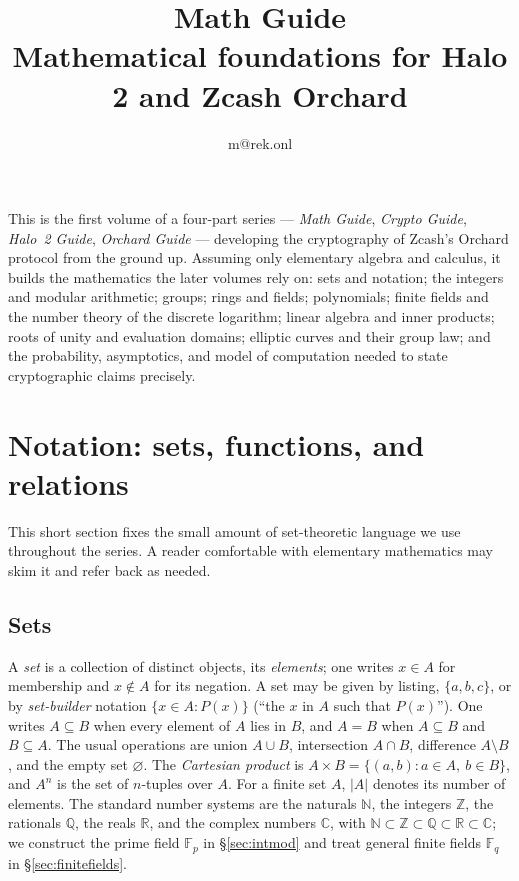 \documentclass[11pt,a4paper]{article}
\title{\textbf{\Huge Math Guide}\\[6pt]\large Mathematical foundations for Halo 2 and Zcash Orchard}
\author{m@rek.onl}
\date{}
\theoremstyle{definition}
\theoremstyle{remark}
\newcommand{\N}{\ensuremath{\mathbb{N}}}
\newcommand{\Z}{\ensuremath{\mathbb{Z}}}
\newcommand{\Q}{\ensuremath{\mathbb{Q}}}
\newcommand{\R}{\ensuremath{\mathbb{R}}}
\providecommand{\C}{}\renewcommand{\C}{\ensuremath{\mathbb{C}}}
\newcommand{\Fp}{\ensuremath{\mathbb{F}_{p}}}
\newcommand{\Fq}{\ensuremath{\mathbb{F}_{q}}}
\renewenvironment{abstract}{%
  \small\begin{center}{\bfseries\abstractname}\end{center}\medskip\noindent\ignorespaces
}{\par\medskip}
\begin{document}
\maketitle
\thispagestyle{empty}
\begin{abstract}
This is the first volume of a four-part series --- \emph{Math Guide}, \emph{Crypto Guide}, \emph{Halo~2 Guide}, \emph{Orchard Guide} --- developing the cryptography of Zcash's Orchard protocol from the ground up. Assuming only elementary algebra and calculus, it builds the mathematics the later volumes rely on: sets and notation; the integers and modular arithmetic; groups; rings and fields; polynomials; finite fields and the number theory of the discrete logarithm; linear algebra and inner products; roots of unity and evaluation domains; elliptic curves and their group law; and the probability, asymptotics, and model of computation needed to state cryptographic claims precisely.
\end{abstract}
\clearpage
\tableofcontents
\clearpage
\section{Notation: sets, functions, and relations}\label{sec:sets}
This short section fixes the small amount of set-theoretic language we use
throughout the series. A reader comfortable with elementary mathematics may
skim it and refer back as needed.

\subsection{Sets}\label{sets:subsec:sets}
A \emph{set} is a collection of distinct objects, its \emph{elements}; one writes
\(x \in A\) for membership and \(x \notin A\) for its negation. A set may be
given by listing, \(\{a,b,c\}\), or by \emph{set-builder} notation
\(\{x \in A : P(x)\}\) (``the \(x\) in \(A\) such that \(P(x)\)''). One writes
\(A \subseteq B\) when every element of \(A\) lies in \(B\), and \(A = B\) when
\(A \subseteq B\) and \(B \subseteq A\). The usual operations are union
\(A \cup B\), intersection \(A \cap B\), difference \(A \setminus B\), and the
empty set \(\varnothing\). The \emph{Cartesian product} is
\(A \times B = \{(a,b) : a \in A,\ b \in B\}\), and \(A^n\) is the set of
\(n\)-tuples over \(A\). For a finite set \(A\), \(\lvert A\rvert\) denotes its
number of elements. The standard number systems are the naturals \(\N\), the
integers \(\Z\), the rationals \(\Q\), the reals \(\R\), and the complex numbers
\(\C\), with \(\N \subset \Z \subset \Q \subset \R \subset \C\); we construct the prime field
\(\Fp\) in \S\ref{sec:intmod} and treat general finite fields \(\Fq\) in
\S\ref{sec:finitefields}.
\end{document}
